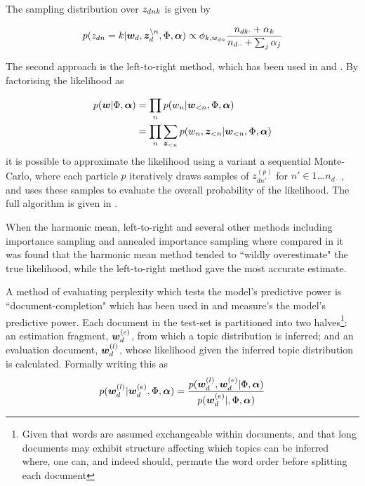 The sampling distribution over ${ z_{dnk} }$ is given by

\begin{align}
p(z_{dn} = k | \bm w_d, \bm z_d^{\setminus n}, \Phi, \bm \alpha) \propto \phi_{k,{w_{dn}}}\frac{n_{dk\cdot} + \alpha_k}{n_{d\cdot\cdot} + \sum_j \alpha_j}
\end{align}

The second approach is the left-to-right method, which has been used in \cite{Mimno2011} and \cite{Mimno2012a}. By factorising the likelihood as

\begin{align}
p(\bm w|\Phi, \bm \alpha) & = \prod_n p(w_n | \bm w_{<n}, \Phi, \bm \alpha) \\
& = \prod_n \sum_{\bm z_{<n}} p(w_n, \bm z_{<n}| \bm w_{<n}, \Phi, \bm \alpha)
\end{align}
it is possible to approximate the likelihood using a variant a sequential Monte-Carlo, where each particle $p$ iteratively draws samples of $z^{(p)}_{dn'}$ for $n' \in 1 \ldots n_{d\cdot\cdot}$, and uses these samples to evaluate the overall probability of the likelihood. The full algorithm is given in \cite{Wallach2009}.

When the harmonic mean, left-to-right and several other methods including importance sampling and annealed importance sampling where compared in \cite{Wallach2009} it was found that the harmonic mean method tended to ``wildly overestimate" the true likelihood, while the left-to-right method gave the most accurate estimate.

A method of evaluating perplexity which tests the model's predictive power is ``document-completion" which has been used in \cite{Virtanen2012a}\cite{Asuncion2012}\cite{RosenZvi2004} and measure's the model's predictive power. Each document in the test-set is partitioned into two halves\footnote{Given that words are assumed exchangeable within documents, and that long documents may exhibit structure affecting which topics can be inferred where, one can, and indeed should, permute the word order before splitting each document}: an estimation fragment, $\bm w_d^{(e)}$, from which a topic distribution is inferred; and an evaluation document, $\bm w_d^{(l)}$, whose likelihood given the inferred topic distribution is calculated. Formally writing this as
\begin{align}
p(\bm w_d^{(l)}|\bm w_d^{(e)}, \Phi, \bm \alpha) = \frac{p(\bm w_d^{(l)},\bm w_d^{(e)} |\Phi, \bm \alpha)}{p(\bm w_d^{(e)}|, \Phi, \bm \alpha)}
\end{align}

